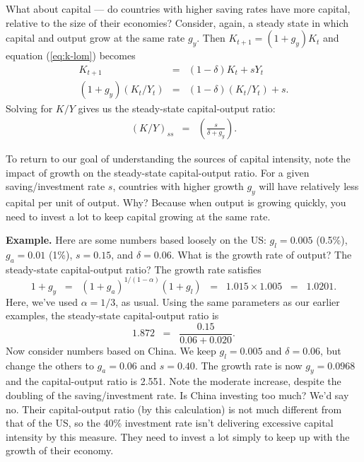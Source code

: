 What about capital --- do countries with higher saving rates have more
capital, relative to the size of their economies?
Consider, again, a steady state in which capital and output grow
at the same rate $g_y$.
Then $K_{t+1} = (1+g_y) K_t$ and equation (\ref{eq:k-lom}) becomes
\begin{eqnarray*}
    K_{t+1}  &=& (1-\delta) K_t + s Y_t  \\
    (1+g_y) (K_{t}/Y_{t}) &=& (1-\delta) (K_t/Y_t) + s .
\end{eqnarray*}
Solving for $K/Y$ gives us the steady-state capital-output ratio:
\begin{eqnarray*}
    (K/Y)_{ss} &=& \left( \frac{s}{\delta+g_y} \right) .
\end{eqnarray*}

To return to our goal of understanding the sources of capital intensity,
note the impact of growth on the steady-state capital-output ratio.
For a given saving/investment rate $s$, countries with higher growth $g_y$
will have relatively less capital per unit of output.
Why?  Because when output is growing quickly,
you need to invest a lot to keep capital growing at the same rate.


\textbf{Example.}
Here are some numbers based loosely on the US:
$ g_l = 0.005 $ (0.5\%), $ g_a = 0.01 $ (1\%), $s=0.15$,
and $\delta = 0.06$.
What is the growth rate of output?
The steady-state capital-output ratio?
The growth rate satisfies
\[
    1+g_y \;\;=\;\; (1+g_a)^{1/(1-\alpha)} (1+g_l) \;\;=\;\; 1.015 \times 1.005
        \;\;=\;\; 1.0201.
\]
Here, we've used $\alpha = 1/3$, as usual.
Using the same parameters as our earlier examples, the steady-state
capital-output ratio is
\[
    1.872 \;\;=\;\; \frac{0.15}{0.06 + 0.020} .
\]
Now consider numbers based on China.
We keep $ g_l = 0.005 $ and $\delta = 0.06$,
but change the others to $ g_a = 0.06 $ and $s = 0.40 $.
The growth rate is now $g_y = 0.0968$ and the capital-output ratio
is 2.551.
Note the moderate increase, despite the doubling of the
saving/investment rate.
Is China investing too much?
We'd say no.
Their capital-output ratio (by this calculation)
is not much different from that of the US, so the 40\% investment
rate isn't delivering excessive capital intensity by this measure.
They need to invest a lot simply to keep up with the growth
of their economy.


